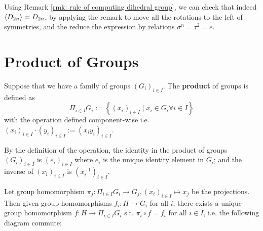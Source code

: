 \documentclass{article}
\begin{document}
\begin{remark}
    Using Remark \ref{rmk: rule of computing dihedral group}, we can check that indeed $\left\langle D_{2n} \right\rangle = D_{2n}$, by applying the remark to move all the rotations to the left of symmetries, and the reduce the expression by relations $\sigma^n = \tau^2 = e$. 
\end{remark}

\section{Product of Groups}

\begin{definition}
    Suppose that we have a family of groups $(G_i)_{i \in I}$. The \textbf{product} of groups is defined as
    \[
        \Pi_{i \in I} G_i := \left\{ (x_i)_{i \in I} \mid x_i \in G_i \forall i \in I \right\}
    \]
    with the operation defined component-wise i.e. $(x_i)_{i \in I} \cdot (y_i)_{i \in I} := (x_i y_i)_{i \in I}$.
\end{definition}

\begin{remark}
    By the definition of the operation, the identity in the product of groups $(G_i)_{i \in I}$ is $(e_i)_{i \in I}$ where $e_i$ is the unique identity element in $G_i$; and the inverse of $(x_i)_{i \in I}$ is $(x_i^{-1})_{i \in I}$.
\end{remark}

\begin{proposition}\label{prop: universal property of product of groups}
    Let group homomorphism $\pi_j: \Pi_{i \in I} G_i \to G_j, (x_i)_{i \in I} \mapsto x_j$ be the projections. Then given group homomorphisms $f_i: H \to G_i$ for all $i$, there exists a unique group homomorphism $f: H \to \Pi_{i \in I} G_i$ s.t. $\pi_i \circ f = f_i$ for all $i \in I$, i.e. the following diagram commute:

    \begin{minipage}{\linewidth}
        \centering
    \end{minipage}
\end{proposition}
\end{document}
